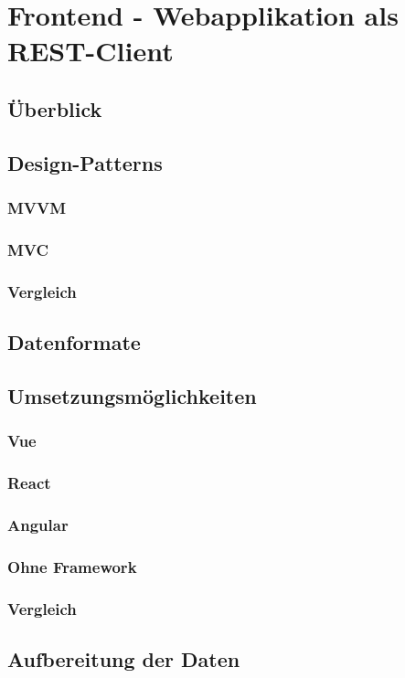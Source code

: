 \section{Frontend - Webapplikation als REST-Client}
\subsection{Überblick}
\subsection{Design-Patterns}
\subsubsection{MVVM}
\subsubsection{MVC}
\subsubsection{Vergleich}
\subsection{Datenformate}
\subsection{Umsetzungsmöglichkeiten}
\subsubsection{Vue}
\subsubsection{React}
\subsubsection{Angular}
\subsubsection{Ohne Framework}
\subsubsection{Vergleich}
\subsection{Aufbereitung der Daten}